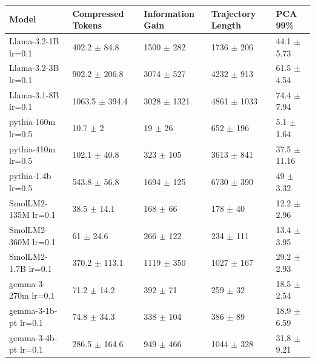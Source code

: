 \begin{tabular}{lllll}
\toprule
 Model                         & Compressed Tokens           & Information Gain         & Trajectory Length        & PCA 99\%                   \\
\midrule
 Llama-3.2-1B {\small lr=0.1}  & 402.2 {\small $\pm$ 84.8}   & 1500 {\small $\pm$ 282}  & 1736 {\small $\pm$ 206}  & 44.1 {\small $\pm$ 5.73}  \\
 Llama-3.2-3B {\small lr=0.1}  & 902.2 {\small $\pm$ 206.8}  & 3074 {\small $\pm$ 527}  & 4232 {\small $\pm$ 913}  & 61.5 {\small $\pm$ 4.54}  \\
 Llama-3.1-8B {\small lr=0.1}  & 1063.5 {\small $\pm$ 394.4} & 3028 {\small $\pm$ 1321} & 4861 {\small $\pm$ 1033} & 74.4 {\small $\pm$ 7.94}  \\
 \midrule
 pythia-160m {\small lr=0.5}   & 10.7 {\small $\pm$ 2}       & 19 {\small $\pm$ 26}     & 652 {\small $\pm$ 196}   & 5.1 {\small $\pm$ 1.64}   \\
 pythia-410m {\small lr=0.5}   & 102.1 {\small $\pm$ 40.8}   & 323 {\small $\pm$ 105}   & 3613 {\small $\pm$ 841}  & 37.5 {\small $\pm$ 11.16} \\
 pythia-1.4b {\small lr=0.5}   & 543.8 {\small $\pm$ 56.8}   & 1694 {\small $\pm$ 125}  & 6730 {\small $\pm$ 390}  & 49 {\small $\pm$ 3.32}    \\
 \midrule
 SmolLM2-135M {\small lr=0.1}  & 38.5 {\small $\pm$ 14.1}    & 168 {\small $\pm$ 66}    & 178 {\small $\pm$ 40}    & 12.2 {\small $\pm$ 2.96}  \\
 SmolLM2-360M {\small lr=0.1}  & 61 {\small $\pm$ 24.6}      & 266 {\small $\pm$ 122}   & 234 {\small $\pm$ 111}   & 13.4 {\small $\pm$ 3.95}  \\
 SmolLM2-1.7B {\small lr=0.1}  & 370.2 {\small $\pm$ 113.1}  & 1119 {\small $\pm$ 350}  & 1027 {\small $\pm$ 167}  & 29.2 {\small $\pm$ 2.93}  \\
 \midrule
 gemma-3-270m {\small lr=0.1}  & 71.2 {\small $\pm$ 14.2}    & 392 {\small $\pm$ 71}    & 259 {\small $\pm$ 32}    & 18.5 {\small $\pm$ 2.54}  \\
 gemma-3-1b-pt {\small lr=0.1} & 74.8 {\small $\pm$ 34.3}    & 338 {\small $\pm$ 104}   & 386 {\small $\pm$ 89}    & 18.9 {\small $\pm$ 6.59}  \\
 gemma-3-4b-pt {\small lr=0.1} & 286.5 {\small $\pm$ 164.6}  & 949 {\small $\pm$ 466}   & 1044 {\small $\pm$ 328}  & 31.8 {\small $\pm$ 9.21}  \\
\bottomrule
\end{tabular}
